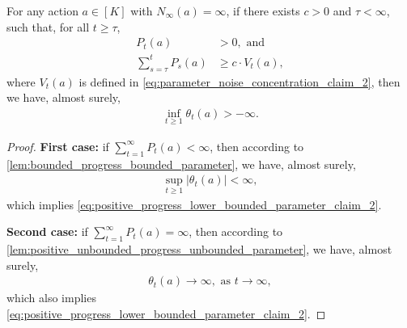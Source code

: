\begin{lemma}
\label{lem:positive_progress_lower_bounded_parameter}
For any action $a \in [K]$ with $N_\infty(a) = \infty$, if there exists $c > 0$ and $\tau < \infty$, such that, for all $t \ge \tau$,
\begin{align}
\label{eq:positive_progress_lower_bounded_parameter_claim_1a}
    P_t(a) &> 0, \text{ and} \\
\label{eq:positive_progress_lower_bounded_parameter_claim_1b}
    \sum_{s=\tau}^{t} P_s(a) &\ge c \cdot V_t(a),
\end{align}
where $V_t(a)$ is defined in \cref{eq:parameter_noise_concentration_claim_2}, 
then we have, almost surely,
\begin{align}
\label{eq:positive_progress_lower_bounded_parameter_claim_2}
    \inf_{t \ge 1}{ \theta_t(a) } > -\infty.
\end{align}
\end{lemma}
\begin{proof}
\textbf{First case:} if $\sum_{t=1}^{\infty} P_t(a) < \infty$, then according to \cref{lem:bounded_progress_bounded_parameter}, we have, almost surely,
\begin{align}
\label{eq:positive_progress_lower_bounded_parameter_proof_1}
    \sup_{t \ge 1}{ |\theta_t(a)| } < \infty,
\end{align}
which implies \cref{eq:positive_progress_lower_bounded_parameter_claim_2}.

\textbf{Second case:} if $\sum_{t=1}^{\infty} P_t(a) = \infty$, then according to \cref{lem:positive_unbounded_progress_unbounded_parameter}, we have, almost surely,
\begin{align}
\label{eq:positive_progress_lower_bounded_parameter_proof_2}
    \theta_t(a) \to \infty, \text{ as } t \to \infty,
\end{align}
which also implies \cref{eq:positive_progress_lower_bounded_parameter_claim_2}.
\end{proof}

